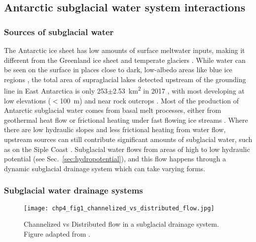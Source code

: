 \subsection{Antarctic subglacial water system interactions}

\subsubsection{Sources of subglacial water}

The Antarctic ice sheet has low amounts of surface meltwater inputs, making it different from the Greenland ice sheet and temperate glaciers \citep{BellAntarcticsurfacehydrology2018}.
While water can be seen on the surface in places close to dark, low-albedo areas like blue ice regions \citep[e.g.][]{KingslakeWidespreadmovementmeltwater2017}, the total area of supraglacial lakes detected upstream of the grounding line in East Antarctica is only 253$\pm$\SI{2.53}{\kilo\metre\squared} in 2017 \citep{StokesWidespreaddistributionsupraglacial2019}, with most developing at low elevations ($<$\SI{100}{\metre}) and near rock outcrops \citep{StokesWidespreaddistributionsupraglacial2019,DirscherlAutomatedMappingAntarctic2020}.
Most of the production of Antarctic subglacial water comes from basal melt processes, either from geothermal heat flow \citep[e.g.][]{FisherHighgeothermalheat2015,Burton-JohnsonReviewarticleGeothermal2020} or frictional heating under fast flowing ice streams \citep[e.g.][]{HoffmanFeedbackscoupledsubglacial2014,ZhaoBasalfrictionFleming2018}.
Where there are low hydraulic slopes and less frictional heating from water flow, upstream sources can still contribute significant amounts of subglacial water, such as on the Siple Coast \citep{AlleyWaterPressureCouplingSliding1989,BougamontNumericalinvestigationsslowdown2003}.
Subglacial water flows from areas of high to low hydraulic potential (see Sec.~\ref{sec:hydropotential}), and this flow happens through a dynamic subglacial drainage system which can take varying forms.


\subsubsection{Subglacial water drainage systems} \label{sec:subglacialdrainagesystems}

\begin{figure}[htbp]
  \texttt{[image: chp4\_fig1\_channelized\_vs\_distributed\_flow.jpg]}
  \caption[Channelized vs distributed flow in a subglacial water system]{
    Channelized vs Distributed flow in a subglacial drainage system.
    Figure adapted from \citet{FlowersModellingwaterflow2015}.
  }
  \label{fig:4.2}
\end{figure}

